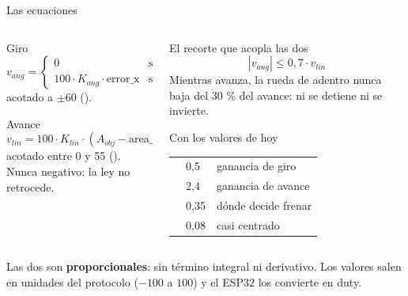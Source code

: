 \begin{frame}{Las ecuaciones}
  \begin{columns}[T,onlytextwidth]
    \begin{column}{0.485\textwidth}
      \begin{block}{Giro}
        \[ v_{ang} = \begin{cases}
             0 & \text{si } |\text{error\_x}| < 0{,}08 \\
             100 \cdot K_{ang} \cdot \text{error\_x} & \text{si no}
           \end{cases} \]
        {\footnotesize acotado a $\pm 60$ ().}
      \end{block}
      \begin{block}{Avance}
        \[ v_{lin} = 100 \cdot K_{lin} \cdot (A_{obj} - \text{area\_ratio}) \]
        {\footnotesize acotado entre 0 y 55 (). Nunca negativo: la
        ley no retrocede.}
      \end{block}
    \end{column}
    \begin{column}{0.485\textwidth}
      \begin{block}{El recorte que acopla las dos}
        \[ |v_{ang}| \leq 0{,}7 \cdot v_{lin} \]
        {\footnotesize Mientras avanza, la rueda de adentro nunca baja del 30 \% del
        avance: ni se detiene ni se invierte.}
      \end{block}
      \begin{block}{Con los valores de hoy}
        {\footnotesize
        \begin{tabular}{L{2.6cm}L{1.0cm}L{2.6cm}}
           & 0,5 & ganancia de giro \\
           & 2,4 & ganancia de avance \\
           & 0,35 & dónde decide frenar \\
           & 0,08 & casi centrado \\
        \end{tabular}}
      \end{block}
    \end{column}
  \end{columns}

  \vspace{0.3em}
  {\footnotesize Las dos son \textbf{proporcionales}: sin término integral ni
  derivativo. Los valores salen en unidades del protocolo ($-100$ a $100$) y
  el ESP32 los convierte en duty.}
\end{frame}

